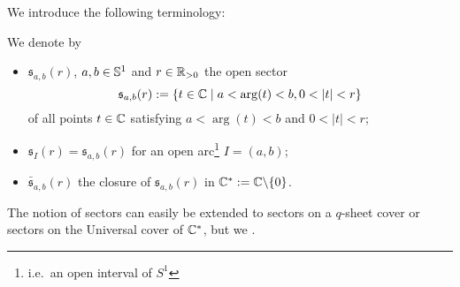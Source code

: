 We introduce the following terminology:
\begin{defn} We denote by
  \begin{itemize}
    \item $\mathfrak{s}_{a,b}(r)$, $a,b\in\S^1$ and $r\in\R_{>0}$ the open
      sector
      \[
        \mathfrak{s}_{a,b}(r):=\left\{t\in\C \mid a<\arg(t)<b, 0<|t|<r\right\}
      \]
      of all points $t\in\C$ satisfying $a<\arg(t)<b$ and $0<|t|<r$;
    \item $\mathfrak{s}_{I}(r)=\mathfrak{s}_{a,b}(r)$ for an open
      arc\footnote{i.e.\ an open interval of $S^1$} $I=(a,b)$;
    \item $\bar{\mathfrak{s}}_{a,b}(r)$ the closure of
      $\mathfrak{s}_{a,b}(r)$ in $\C^*:=\C\backslash\{0\}$.
  \end{itemize}
  The notion of sectors can easily be extended to sectors on a $q$-sheet cover
  or sectors on the Universal cover of $\C^*$, but we .
\end{defn}
